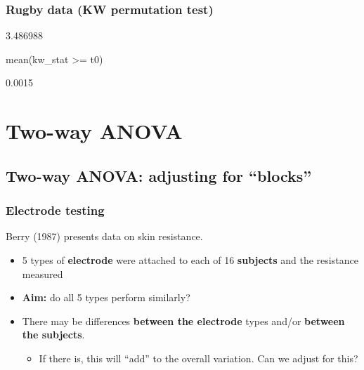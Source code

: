 \documentclass[a4paper]{article}
\begin{document}
\subsubsection{Rugby data (KW permutation test)}
\begin{Schunk}
\begin{Soutput}
[1] 3.486988
\end{Soutput}
\begin{Sinput}
mean(kw_stat >= t0)
\end{Sinput}
\begin{Soutput}
[1] 0.0015
\end{Soutput}
\end{Schunk}

\section{Two-way ANOVA}\label{sec:24}
\subsection{Two-way ANOVA: adjusting for ``blocks''}
\subsubsection{Electrode testing}
Berry (1987) presents data on skin resistance.
\begin{itemize}
	\item 5 types of \textcolor{mygreen}{\textbf{electrode}} were attached to each of 16 \textcolor{myred}{\textbf{subjects}} and the resistance measured
	\item \textbf{Aim:} do all 5 types perform similarly?
	\item There may be differences \textcolor{mygreen}{\textbf{between the electrode}} types and/or \textcolor{myred}{\textbf{between the subjects}}.
	\begin{itemize}
		\item If there is, this will ``add'' to the overall variation. Can we adjust for this?
	\end{itemize}
\end{itemize}
\end{document}
